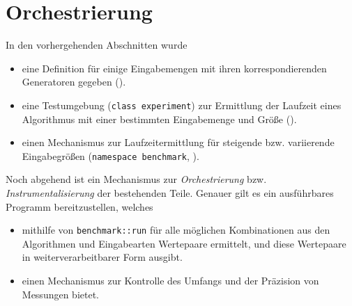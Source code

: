 
\section{Orchestrierung}

In den vorhergehenden Abschnitten wurde

\begin{itemize}
    \item eine Definition für einige Eingabemengen mit ihren korrespondierenden Generatoren gegeben ().
    \item eine Testumgebung (\lstinline{class experiment}) zur Ermittlung der Laufzeit eines Algorithmus mit einer bestimmten Eingabemenge und Größe ().
    \item einen Mechanismus zur Laufzeitermittlung für steigende bzw. variierende Eingabegrößen (\lstinline{namespace benchmark}, ).
\end{itemize}

Noch abgehend ist ein Mechanismus zur \emph{Orchestrierung} bzw. \emph{Instrumentalisierung} der bestehenden Teile. Genauer gilt es ein ausführbares Programm bereitzustellen, welches

\begin{itemize}
    \item mithilfe von \lstinline{benchmark::run} für alle möglichen Kombinationen aus den Algorithmen und Eingabearten Wertepaare ermittelt, und diese Wertepaare in weiterverarbeitbarer Form ausgibt.

    \item einen Mechanismus zur Kontrolle des Umfangs und der Präzision von Messungen bietet.
\end{itemize}

